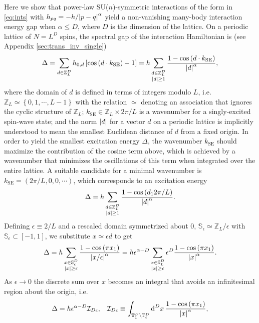 \documentclass[nofootinbib,notitlepage,11pt]{revtex4-2}
\renewcommand{\t}{\text} %
\newcommand{\f}[2]{\dfrac{#1}{#2}} %
\newcommand{\p}[1]{\left(#1\right)} %
\renewcommand{\sp}[1]{\left[#1\right]} %
\renewcommand{\set}[1]{\left\{#1\right\}} %
\renewcommand{\c}{\cdot} %
\newcommand{\1}{\mathds{1}}
\renewcommand{\d}{\text{d}}
\newcommand{\I}{\mathcal{I}}
\renewcommand{\SS}{\mathbb{S}}
\newcommand{\TT}{\mathbb{T}}
\newcommand{\ZZ}{\mathbb{Z}}
\begin{document}
Here we show that power-law SU($n$)-symmetric interactions of the form
in \eqref{eq:ints} with $h_{pq}=-h/\abs{p-q}^\alpha$ yield a
non-vanishing many-body interaction energy gap when $\alpha\le D$,
where $D$ is the dimension of the lattice.  On a periodic lattice of
$N=L^D$ spins, the spectral gap of the interaction Hamiltonian is (see
Appendix \ref{sec:trans_inv_single})
\begin{align}
  \Delta
  = \sum_{d\in\ZZ_L^D} h_{0,d} \sp{\cos\p{d \c k_{\t{SE}}}-1}
  = h \sum_{\substack{d\in\ZZ_L^D\\\abs{d}\ge1}}
  \f{1-\cos\p{d \c k_{\t{SE}}}}{\abs{d}^\alpha},
\end{align}
where the domain of $d$ is defined in terms of integers modulo $L$,
i.e.~$\ZZ_L\simeq\set{0,1,\cdots,L-1}$ with the relation $\simeq$
denoting an association that ignores the cyclic structure of $\ZZ_L$;
$k_{\t{SE}}\in\ZZ_L\times2\pi/L$ is a wavenumber for a singly-excited
spin-wave state; and the norm $\abs{d}$ for a vector $d$ on a periodic
lattice is implicitly understood to mean the smallest Euclidean
distance of $d$ from a fixed origin.  In order to yield the smallest
excitation energy $\Delta$, the wavenumber $k_{\t{SE}}$ should
maximize the contribution of the cosine term above, which is achieved
by a wavenumber that minimizes the oscillations of this term when
integrated over the entire lattice.  A suitable candidate for a
minimal wavenumber is $k_{\t{SE}}=\p{2\pi/L,0,0,\cdots}$, which
corresponds to an excitation energy
\begin{align}
  \Delta = h \sum_{\substack{d\in\ZZ_L^D\\\abs{d}\ge1}}
  \f{1-\cos\p{d_12\pi/L}}{\abs{d}^\alpha}.
\end{align}
Defining $\epsilon\equiv2/L$ and a rescaled domain symmetrized about
$0$, $\SS_\epsilon\simeq\ZZ_L/\epsilon$ with
$\SS_\epsilon\subset\sp{-1,1}$, we substitute $x\simeq\epsilon d$ to
get
\begin{align}
  \Delta
  = h \sum_{\substack{x\in\SS_\epsilon^D\\\abs{x}\ge\epsilon}}
  \f{1-\cos\p{\pi x_1}}{\abs{x/\epsilon}^\alpha}
  = h \epsilon^{\alpha-D} \sum_{\substack{x\in\SS_L^D\\\abs{x}\ge\epsilon}}
  \epsilon^D \f{1-\cos\p{\pi x_1}}{\abs{x}^\alpha}.
\end{align}
As $\epsilon\to0$ the discrete sum over $x$ becomes an integral that
avoids an infinitesimal region about the origin, i.e.
\begin{align}
  \Delta = h \epsilon^{\alpha-D} \I_{D\epsilon},
  &&
  \I_{D\epsilon}
  \equiv \int_{\TT_1^D\setminus\TT_\epsilon^D} \d^Dx\,
  \f{1-\cos\p{\pi x_1}}{\abs{x}^\alpha},
\end{align}
\end{document}
